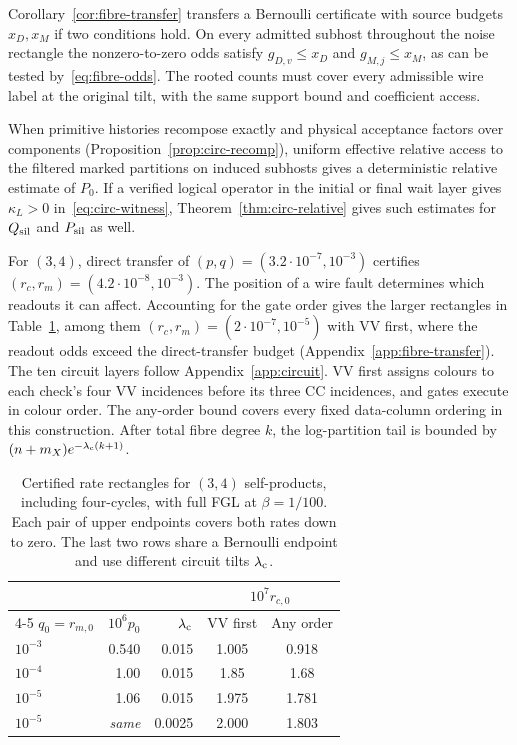 \documentclass[10pt,twocolumn]{article}
\theoremstyle{definition}
\begin{document}
Corollary~\ref{cor:fibre-transfer} transfers a Bernoulli certificate
with source budgets $x_D,x_M$ if two conditions hold. On every admitted
subhost throughout the noise rectangle the nonzero-to-zero odds satisfy
$g_{D,v}\le x_D$ and $g_{M,j}\le x_M$, as can be tested
by~\eqref{eq:fibre-odds}. The rooted counts must cover every admissible
wire label at the original tilt, with the same support bound and
coefficient access.

When primitive histories recompose exactly and physical acceptance
factors over components (Proposition~\ref{prop:circ-recomp}),
uniform effective relative access to the
filtered marked partitions on induced subhosts gives a deterministic
relative estimate of $P_0$. If a verified logical operator in the
initial or final wait layer gives $\kappa_L>0$ in~\eqref{eq:circ-witness},
Theorem~\ref{thm:circ-relative} gives such estimates for $Q_{\rm sil}$
and $P_{\rm sil}$ as well.

For $(3,4)$, direct transfer of $(p,q)=(3.2\cdot10^{-7},10^{-3})$
certifies $(r_c,r_m)=(4.2\cdot10^{-8},10^{-3})$. The position of a
wire fault determines which readouts it can affect. Accounting for the
gate order gives the larger rectangles in Table~\ref{tab:fibre-34},
among them $(r_c,r_m)=(2\cdot10^{-7},10^{-5})$ with VV first, where
the readout odds exceed the direct-transfer budget
(Appendix~\ref{app:fibre-transfer}).
The ten circuit layers follow Appendix~\ref{app:circuit}. VV first
assigns colours to each check's four VV incidences before its three
CC incidences, and gates execute in colour order. The any-order bound
covers every fixed data-column ordering in this construction. After
total fibre degree $k$, the log-partition tail is bounded by
$(n+m_X)e^{-\lambda_{\rm c}(k+1)}$.

\begin{table}[!htb]
\centering\small
\caption{Certified rate rectangles for $(3,4)$ self-products, including
four-cycles, with full FGL at $\beta=1/100$. Each pair of upper endpoints
covers both rates down to zero. The last two rows share a Bernoulli
endpoint and use different circuit tilts $\lambda_{\rm c}$.}
\label{tab:fibre-34}
\smallskip
\begin{tabular}{@{}lrrcc@{}}
\toprule
 & & & \multicolumn{2}{c}{$10^{7}r_{c,0}$}\\
\cmidrule(l){4-5}
$q_0=r_{m,0}$ & $10^6p_0$ & $\lambda_{\rm c}$ & VV first & Any order\\
\midrule
$10^{-3}$ & 0.540 & 0.015  & 1.005 & 0.918\\
$10^{-4}$ & 1.00  & 0.015  & 1.85  & 1.68\\
$10^{-5}$ & 1.06  & 0.015  & 1.975 & 1.781\\
$10^{-5}$ & \textit{same} & 0.0025 & 2.000 & 1.803\\
\bottomrule
\end{tabular}
\end{table}
\end{document}
